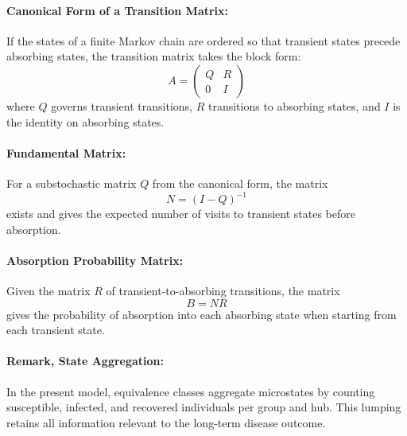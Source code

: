\documentclass[a4paper]{article}
\begin{document}
	\paragraph{\textbf{Canonical Form of a Transition Matrix:}}
	If the states of a finite Markov chain are ordered so that transient states precede absorbing states, the transition matrix takes the block form:
	\[
	A = \begin{pmatrix}
		Q & R \\
		0 & I
	\end{pmatrix}
	\]
	where $Q$ governs transient transitions, $R$ transitions to absorbing states, and $I$ is the identity on absorbing states.
	
	\paragraph{\textbf{Fundamental Matrix:}}
	For a substochastic matrix $Q$ from the canonical form, the matrix
	\[
	N = (I - Q)^{-1}
	\]
	exists and gives the expected number of visits to transient states before absorption.
	
	\paragraph{\textbf{Absorption Probability Matrix:}}
	Given the matrix $R$ of transient-to-absorbing transitions, the matrix
	\[
	B = NR
	\]
	gives the probability of absorption into each absorbing state when starting from each transient state.
	
	\paragraph{\textbf{Remark, State Aggregation:}}
	In the present model, equivalence classes aggregate microstates by counting susceptible, infected, and recovered individuals per group and hub. This lumping retains all information relevant to the long-term disease outcome.
\end{document}
